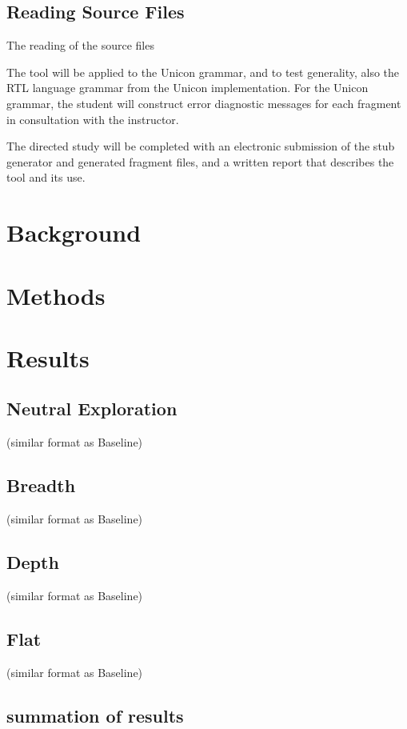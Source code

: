 \documentclass{article}
\begin{document}
\subsection{Reading Source Files}
The reading of the source files 




The tool will be applied to the Unicon grammar, and to test generality, also the RTL language grammar from the Unicon implementation. For the Unicon grammar, the student will construct error diagnostic messages for each fragment in consultation with the instructor.

The directed study will be completed with an electronic submission of the stub generator and generated fragment files, and a written report that describes the tool and its use.


\section{Background}


\section{Methods}

\section{Results}


 
\subsection{Neutral Exploration}
(similar format as Baseline)
\subsection{Breadth}
(similar format as Baseline)
\subsection{Depth}
(similar format as Baseline)
\subsection{Flat}
(similar format as Baseline)
\subsection{summation of results}
\end{document}
